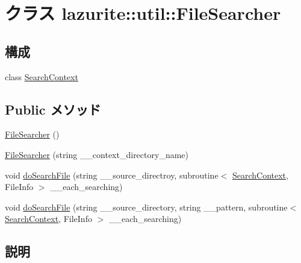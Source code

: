 \hypertarget{classlazurite_1_1util_1_1_file_searcher}{
\section{クラス lazurite::util::FileSearcher}
\label{classlazurite_1_1util_1_1_file_searcher}
}
\subsection*{構成}
\begin{DoxyCompactItemize}
\item 
class \hyperlink{classlazurite_1_1util_1_1_file_searcher_1_1_search_context}{SearchContext}
\end{DoxyCompactItemize}
\subsection*{Public メソッド}
\begin{DoxyCompactItemize}
\item 
\hyperlink{classlazurite_1_1util_1_1_file_searcher_a8b7b2ad0f76b7d0ea29242f4f3c1672d}{FileSearcher} ()
\item 
\hyperlink{classlazurite_1_1util_1_1_file_searcher_a5652c03915ddc186e4694d182f267500}{FileSearcher} (string \_\-\_\-context\_\-directory\_\-name)
\item 
void \hyperlink{classlazurite_1_1util_1_1_file_searcher_a35af502ec9da1c9fd19a02d386a7d5d0}{doSearchFile} (string \_\-\_\-source\_\-directroy, subroutine$<$ \hyperlink{classlazurite_1_1util_1_1_file_searcher_1_1_search_context}{SearchContext}, FileInfo $>$ \_\-\_\-each\_\-searching)
\item 
void \hyperlink{classlazurite_1_1util_1_1_file_searcher_a6f0edc6095593e8cded48afbe2f442fa}{doSearchFile} (string \_\-\_\-source\_\-directory, string \_\-\_\-pattern, subroutine$<$ \hyperlink{classlazurite_1_1util_1_1_file_searcher_1_1_search_context}{SearchContext}, FileInfo $>$ \_\-\_\-each\_\-searching)
\end{DoxyCompactItemize}


\subsection{説明}


